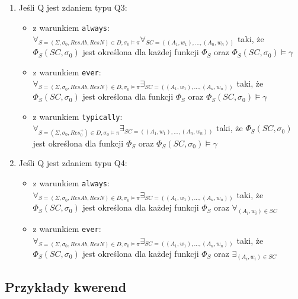\documentclass{article}
\begin{document}
\begin{enumerate}
	\item Jeśli Q jest zdaniem typu Q3:
	\begin{itemize}
		\item z warunkiem \texttt{always}: 
		$\forall_{S=(\Sigma, \sigma_{0}, ResAb, ResN) \in D, \sigma_{0} \models \pi} \forall_{SC=((A_{1}, w_{1}), \dots, (A_{n}, w_{n}))}$ taki, że $\Phi_{S}(SC, \sigma_{0})$ jest określona dla każdej funkcji $\Phi_{S}$ oraz $\Phi_{S}(SC, \sigma_{0}) \models \gamma$
		\item z warunkiem \texttt{ever}:
		$\forall_{S=(\Sigma, \sigma_{0}, ResAb, ResN) \in D, \sigma_{0} \models \pi} \exists_{SC=((A_{1}, w_{1}), \dots, (A_{n}, w_{n}))}$ taki, że $\Phi_{S}(SC, \sigma_{0})$ jest określona dla funkcji $\Phi_{S}$ oraz $\Phi_{S}(SC, \sigma_{0}) \models \gamma$
		\item z warunkiem \texttt{typically}:
		$\forall_{S=(\Sigma, \sigma_{0}, Res_{0}^{+}) \in D, \sigma_{0} \models \pi} \exists_{SC=((A_{1}, w_{1}), \dots, (A_{n}, w_{n}))}$ taki, że $\Phi_{S}(SC, \sigma_{0})$ jest określona dla funkcji $\Phi_{S}$ oraz $\Phi_{S}(SC, \sigma_{0}) \models \gamma$
	\end{itemize}
	\item Jeśli Q jest zdaniem typu Q4:
	\begin{itemize}
		\item z warunkiem \texttt{always}: 
		$\forall_{S=(\Sigma, \sigma_{0}, ResAb, ResN) \in D, \sigma_{0} \models \pi} \exists_{SC=((A_{1}, w_{1}), \dots, (A_{n}, w_{n}))}$ taki, że $\Phi_{S}(SC, \sigma_{0})$ jest określona dla każdej funkcji $\Phi_{S}$ oraz $\forall_{(A_{i}, w_{i}) \in SC}$
		\item z warunkiem \texttt{ever}:
		$\forall_{S=(\Sigma, \sigma_{0}, ResAb, ResN) \in D, \sigma_{0} \models \pi} \exists_{SC=((A_{1}, w_{1}), \dots, (A_{n}, w_{n}))}$ taki, że $\Phi_{S}(SC, \sigma_{0})$ jest określona dla każdej funkcji $\Phi_{S}$ oraz $\exists_{(A_{i}, w_{i}) \in SC}$
	\end{itemize}
\end{enumerate} 


\newpage
\subsection{Przykłady kwerend}
\end{document}
